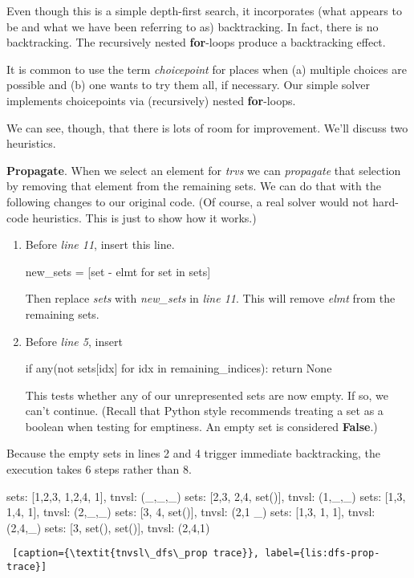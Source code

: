 Even though this is a simple depth-first search, it incorporates (what appears to be and what we have been referring to as) backtracking. In fact, there is no backtracking. The recursively nested \textbf{for}-loops produce a backtracking effect.  

It is common to use the term \textit{choicepoint} for places when (a) multiple choices are possible and (b) one wants to try them all, if necessary. Our simple solver implements choicepoints via (recursively) nested \textbf{for}-loops. 

We can see, though, that there is lots of room for improvement. We'll discuss two heuristics. 

\noindent\textbf{Propagate}. When we select an element for \textit{trvs} we can \textit{propagate} that selection by removing that element from the remaining sets. We can do that with the following changes to our original code. (Of course, a real solver would not hard-code heuristics. This is just to show how it works.)
\begin{enumerate}
    \item Before \textit{line 11}, insert this line.
    
\begin{minipage}[c]{0.45\textwidth}
\begin{python1}
new_sets = [set - {elmt} for set in sets]
\end{python1}
\end{minipage}

Then replace \textit{sets} with \textit{new\_sets} in \textit{line 11}.
This will remove \textit{elmt} from the remaining sets.

    \item Before \textit{line 5}, insert
    
\begin{python1}
if any(not sets[idx] for idx in remaining_indices):
  return None
\end{python1}

This tests whether any of our unrepresented sets are now empty. If so, we can't continue. (Recall that Python style recommends treating a set as a boolean when testing for emptiness. An empty set is considered \textbf{False}.)


\end{enumerate}

Because the empty sets in lines 2 and 4  trigger immediate backtracking, the execution takes 6 steps rather than 8.

\smallv
\begin{minipage}[c]{0.45\textwidth}
\begin{python1}[numbers=left]
sets: [{1,2,3}, {1,2,4}, {1}], tnvsl: (_,_,_)
  sets: [{2,3}, {2,4}, set()], tnvsl: (1,_,_)
  sets: [{1,3}, {1,4}, {1}], tnvsl: (2,_,_)
    sets: [{3}, {4}, set()], tnvsl: (2,1 _)
    sets: [{1,3}, {1}, {1}], tnvsl: (2,4,_)
      sets: [{3}, set(), set()], tnvsl: (2,4,1)
\end{python1}
\begin{lstlisting} [caption={\textit{tnvsl\_dfs\_prop trace}}, label={lis:dfs-prop-trace}]
\end{lstlisting}
\end{minipage}


